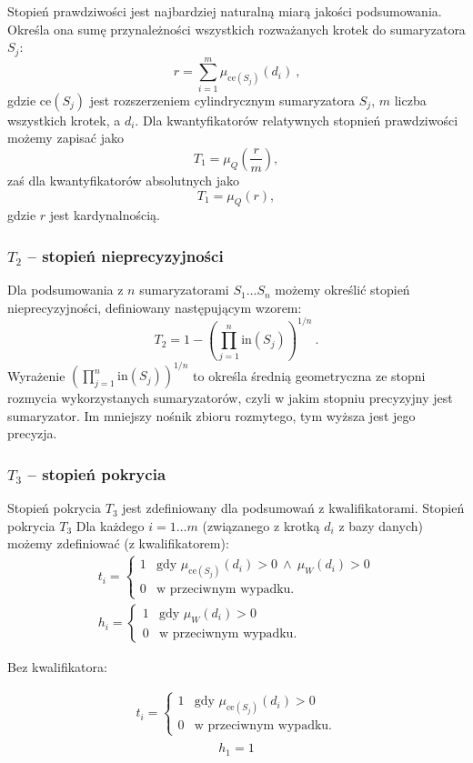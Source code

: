 \documentclass{classrep}
\begin{document}
Stopień prawdziwości jest najbardziej naturalną miarą jakości podsumowania. Określa ona sumę przynależności wszystkich rozważanych krotek do sumaryzatora \(S_j\):
\[r = \sum_{i=1}^{m} \mu_{\mathrm{ce}(S_j)}(d_i) ~\mbox{,}\]
gdzie \(\mathrm{ce}(S_j)\) jest rozszerzeniem cylindrycznym
sumaryzatora \(S_j\), \(m\) liczba wszystkich krotek, a \(d_i\).
Dla kwantyfikatorów relatywnych stopnień
prawdziwości możemy zapisać jako
$$T_1 = \mu_Q(\frac{r}{m}),$$
zaś dla kwantyfikatorów absolutnych jako
$$T_1 = \mu_Q(r),$$
gdzie \(r\) jest kardynalnością. 

\subsubsection{\(T_2\) -- stopień nieprecyzyjności}
Dla podsumowania z \(n\) sumaryzatorami \(S_1 \ldots S_n\) możemy określić stopień nieprecyzyjności,
definiowany następującym wzorem:
\[T_2 = 1 - \left(\prod_{j=1}^{n} \mathrm{in}(S_j)\right)^{1/n} ~\mbox{.}\]
Wyrażenie \(\left(\prod_{j=1}^{n} \mathrm{in}(S_j)\right)^{1/n}\) to określa średnią geometryczna ze stopni rozmycia wykorzystanych sumaryzatorów, czyli w jakim stopniu precyzyjny jest sumaryzator. Im mniejszy nośnik zbioru rozmytego, tym wyższa jest jego precyzja.
   

\subsubsection{\(T_3\) -- stopień pokrycia}
Stopień pokrycia \(T_3\) jest zdefiniowany dla podsumowań z kwalifikatorami. Stopień pokrycia $T_3$ 
Dla każdego \(i=1\ldots m\) (związanego z krotką \(d_i\) z bazy
danych) możemy zdefiniować (z kwalifikatorem):
\[
\begin{array}{l}
t_i = \begin{cases}
1 & \mbox{gdy } \mu_{\mathrm{ce}(S_j)}(d_i) > 0 ~ \wedge ~ \mu_{W}(d_i) > 0 \\
0 & \mbox{w przeciwnym wypadku.}
\end{cases} \\
h_i = \begin{cases}
1 & \mbox{gdy } \mu_{W}(d_i) > 0 \\
0 & \mbox{w przeciwnym wypadku.}
\end{cases}
\end{array}\]

Bez kwalifikatora:

\[
\begin{array}{l}
t_i = \begin{cases}
1 & \mbox{gdy } \mu_{\mathrm{ce}(S_j)}(d_i) > 0  \\
0 & \mbox{w przeciwnym wypadku.}
\end{cases} \\
\end{array}\]
\[h_1 = 1\]
\end{document}
